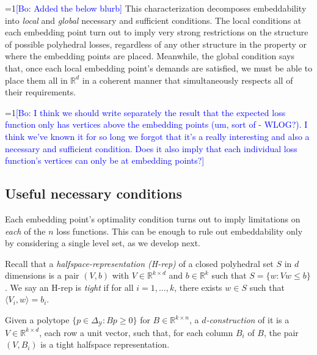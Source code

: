 \documentclass[11pt]{colt2019}
\newcommand{\Comments}{1}
\newcommand{\mynote}[2]{\ifnum\Comments=1\textcolor{#1}{#2}\fi}
\newcommand{\bo}[1]{\mynote{blue}{[Bo: #1]}}
\newcommand{\reals}{\mathbb{R}}
\newcommand{\Y}{\mathcal{Y}}
\begin{document}
\bo{Added the below blurb}
This characterization decomposes embeddability into \emph{local} and \emph{global} necessary and sufficient conditions.
The local conditions at each embedding point turn out to imply very strong restrictions on the structure of possible polyhedral losses, regardless of any other structure in the property or where the embedding points are placed.
Meanwhile, the global condition says that, once each local embedding point's demands are satisfied, we must be able to place them all in $\reals^d$ in a coherent manner that simultaneously respects all of their requirements.

\bo{I think we should write separately the result that the expected loss function only has vertices above the embedding points (um, sort of - WLOG?). I think we've known it for so long we forgot that it's a really interesting and also a necessary and sufficient condition. Does it also imply that each individual loss function's vertices can only be at embedding points?}

\subsection{Useful necessary conditions}

Each embedding point's optimality condition turns out to imply limitations on \emph{each} of the $n$ loss functions.
This can be enough to rule out embeddability only by considering a single level set, as we develop next.

Recall that a \emph{halfspace-representation (H-rep)} of a closed polyhedral set $S$ in $d$ dimensions is a pair $(V,b)$ with $V \in \reals^{k \times d}$ and $b \in \reals^k$ such that $S = \{ w : Vw \leq b \}$.
We say an H-rep is \emph{tight} if for all $i=1,\dots,k$, there exists $w \in S$ such that $\langle V_i , w \rangle = b_i$.

\begin{definition}
  Given a polytope $\{p \in \Delta_{\Y} : Bp \geq 0\}$ for $B \in \reals^{k \times n}$, a \emph{$d$-construction} of it is a $V \in \reals^{k \times d}$, each row a unit vector, such that, for each column $B_i$ of $B$, the pair $(V,B_i)$ is a tight halfspace representation.
\end{definition}
\end{document}
